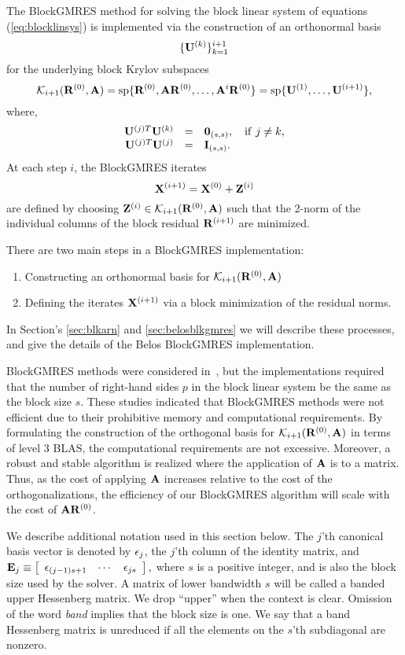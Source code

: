 \documentclass{article}
\newcommand{\bA}{{\bf A}}
\newcommand{\bE}{{\bf E}}
\newcommand{\bI}{{\bf I}}
\newcommand{\bR}{{\bf R}}
\newcommand{\bU}{{\bf U}}
\newcommand{\bX}{{\bf X}}
\newcommand{\bZ}{{\bf Z}}
\newcommand{\dm}{\begin{displaymath}}
\newcommand{\edm}{\end{displaymath}}
\begin{document}
The BlockGMRES method for solving the block linear system of
equations (\ref{eq:blocklinsys}) is implemented via the
construction of an orthonormal basis
 \dm
 \{ \bU^{(k)} \}_{k=1}^{i+1}
 \edm
for the underlying block Krylov subspaces
  \dm
 {\cal K}_{i+1}(\bR^{(0)},\bA) = {\rm sp}\{\bR^{(0)},\bA
 \bR^{(0)},\ldots,\bA^{i}\bR^{(0)}\}= {\rm sp}\{ \bU^{(1)},
 \ldots, \bU^{(i+1)} \},
 \edm
where,
 \dm
 \begin{array}{rcl}
 \bU^{(j)T} \bU^{(k)} &=& {\bf 0}_{(s,s)}, \quad {\rm
 if}~j \ne k, \\
 \bU^{(j)T} \bU^{(j)} &=& \bI_{(s,s)}.
 \end{array}
 \edm
At each step $i$, the BlockGMRES iterates
 \dm
 \bX^{(i+1)} = \bX^{(0)} + \bZ^{(i)}
 \edm
are defined by choosing $\bZ^{(i)} \in {\cal K}_{i+1}(\bR^{(0)},
\bA)$ such that the 2-norm of the individual columns of the block
residual $\bR^{(i+1)}$ are minimized.

There are two main steps in a BlockGMRES implementation:
\begin{enumerate}
\item Constructing an orthonormal basis for ${\cal
K}_{i+1}(\bR^{(0)}, \bA)$
\item Defining the iterates $\bX^{(i+1)}$ via a block minimization
of the residual norms.
\end{enumerate}
In Section's \ref{sec:blkarn} and \ref{sec:belosblkgmres} we will
describe these processes, and give the details of the Belos
BlockGMRES implementation.


BlockGMRES methods were considered in~\cite{siga:95,siga:96}, but
the implementations required that the number of right-hand sides
$p$ in the block linear system be the same as the block size $s$.
These studies indicated that BlockGMRES methods were not efficient
due to their prohibitive memory and computational requirements. By
formulating the construction of the orthogonal basis for ${\cal
K}_{i+1}(\bR^{(0)}, \bA)$ in terms of level 3 BLAS, the
computational requirements are not excessive. Moreover, a robust
and stable algorithm is realized where the application of $\bA$ is
to a matrix.  Thus, as the cost of applying $\bA$ increases
relative to the cost of the orthogonalizations, the efficiency of
our BlockGMRES algorithm will scale with the cost of $\bA
\bR^{(0)}$.

We describe additional notation used in this section below. The
$j$'th canonical basis vector is denoted by ${\bf \epsilon}_j$,
the $j$'th column of the identity matrix, and
 $\bE_j \equiv \left[\begin{array}{ccc}
                    {\bf \epsilon}_{(j-1)s+1} & \cdots & {\bf \epsilon}_{js}
                   \end{array}\right] ,$
where $s$ is a positive integer, and is also the block size used
by the solver. A matrix of lower bandwidth $s$ will be called a
banded upper Hessenberg matrix.  We drop ``upper'' when the
context is clear. Omission of the word {\em band} implies that the
block size is one. We say that a band Hessenberg matrix is
unreduced if all the elements on the $s$'th subdiagonal are
nonzero.
\end{document}
